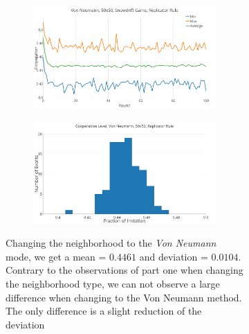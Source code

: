 \documentclass[a4paper, 11pt]{article}
\begin{document}
\begin{figure}[H]
\begin{subfigure}{.55\textwidth}
	\begin{subfigure}{1\textwidth}
		\includegraphics[width=1\linewidth]{SDVonNeumann50x50}
	\end{subfigure}

	\begin{subfigure}{1\textwidth}
		\includegraphics[width=1\linewidth]{SDVonNeumann50x50HG}
	\end{subfigure}
\end{subfigure}%
\begin{subfigure}{.45\textwidth}
	Changing the neighborhood to the \textit{Von Neumann} mode, we get a mean = $0.4461$ and deviation = $0.0104$. Contrary to the observations of part one when changing the neighborhood type, we can not observe a large difference when changing to the Von Neumann method. The only difference is a slight reduction of the deviation
\end{subfigure}

\end{figure}
\end{document}
